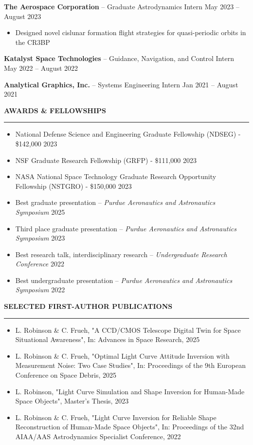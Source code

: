 \documentclass[10pt, a4paper]{article}
\newcommand{\sectiontitle}[1]{{\Large \textbf{#1}}\vspace{0.5em}\hrule\vspace{0.5em}}
\begin{document}
\textbf{The Aerospace Corporation} -- Graduate Astrodynamics Intern \hfill May 2023 -- August 2023
\begin{itemize}[noitemsep]
    \item Designed novel cislunar formation flight strategies for quasi-periodic orbits in the CR3BP
\end{itemize}

\textbf{Katalyst Space Technologies} -- Guidance, Navigation, and Control Intern \hfill May 2022 -- August 2022
\vspace{3px}

\textbf{Analytical Graphics, Inc.} -- Systems Engineering Intern \hfill Jan 2021 -- August 2021
\vspace{7px}

\sectiontitle{AWARDS \& FELLOWSHIPS}
\begin{itemize}[noitemsep]
    \item National Defense Science and Engineering Graduate Fellowship (NDSEG) - \$142,000 \hfill 2023
    \item NSF Graduate Research Fellowship (GRFP) - \$111,000 \hfill 2023
    \item NASA National Space Technology Graduate Research Opportunity Fellowship (NSTGRO) - \$150,000 \hfill 2023
    \item Best graduate presentation -- \textit{Purdue Aeronautics and Astronautics Symposium} \hfill 2025
    \item Third place graduate presentation -- \textit{Purdue Aeronautics and Astronautics Symposium} \hfill 2023
    \item Best research talk, interdisciplinary research -- \textit{Undergraduate Research Conference} \hfill 2022
    \item Best undergraduate presentation -- \textit{Purdue Aeronautics and Astronautics Symposium} \hfill 2022
\end{itemize}


\sectiontitle{SELECTED FIRST-AUTHOR PUBLICATIONS}
\begin{itemize}[noitemsep]
    \item L. Robinson \& C. Frueh, "A CCD/CMOS Telescope Digital Twin for Space Situational Awareness", In: Advances in Space Research, 2025
    \item L. Robinson \& C. Frueh, "Optimal Light Curve Attitude Inversion with Measurement Noise: Two Case Studies", In: Proceedings of the 9th European Conference on Space Debris, 2025
    \item L. Robinson, "Light Curve Simulation and Shape Inversion for Human-Made Space Objects", Master's Thesis, 2023
    \item L. Robinson \& C. Frueh, "Light Curve Inversion for Reliable Shape Reconstruction of Human-Made Space Objects", In: Proceedings of the 32nd AIAA/AAS Astrodynamics Specialist Conference, 2022
\end{itemize}
\end{document}

